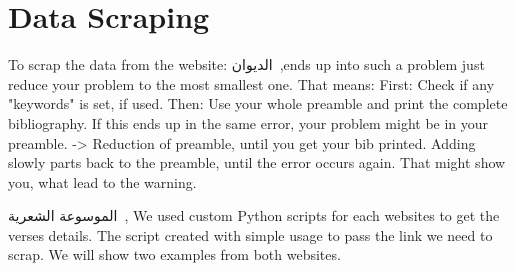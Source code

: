 \section{Data Scraping}\label{sec:data_scrap}
To scrap the data from the website: \textarabic{الديوان}~\cite{diwan},ends up into such a problem just reduce your problem to the most smallest one. That means: First: Check if any "keywords" is set, if used. Then: Use your whole preamble and print the complete bibliography. If this ends up in the same error, your problem might be in your preamble. -> Reduction of preamble, until you get your bib printed. Adding slowly parts back to the preamble, until the error occurs again. That might show you, what lead to the warning.

 \textarabic{الموسوعة الشعرية}~\cite{PoetryEncyclopedia2016}, We used custom Python scripts for each websites to get the verses details. The script created with simple usage to pass the link we need to scrap. We will show two examples from both websites.
